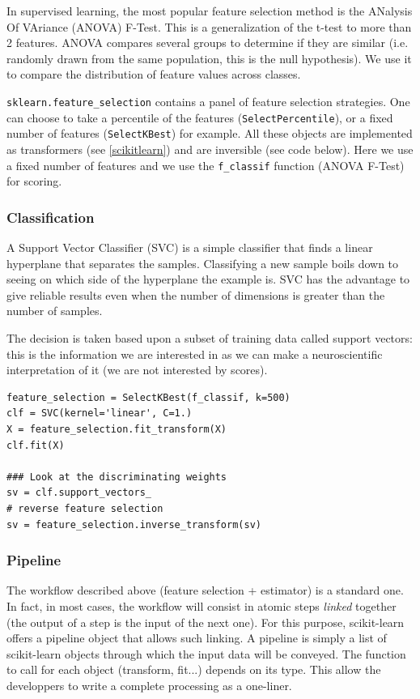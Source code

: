 \documentclass{frontiersSCNS} %
\begin{document}
In supervised learning, the most popular feature selection method is the
ANalysis Of VAriance (ANOVA) F-Test. This is a generalization of the t-test to
more than 2 features. ANOVA compares several
groups to determine if they are similar (i.e. randomly drawn from the same
population, this is the null hypothesis). We use it to compare the distribution
of feature values across classes.

\verb!sklearn.feature_selection! contains a panel of feature selection
strategies. One can choose to take a percentile of the features
(\verb!SelectPercentile!), or a fixed number of features (\verb!SelectKBest!)
for example. All these objects are implemented as transformers (see
\ref{scikitlearn}) and are inversible (see code below).
Here we use a fixed number of features and we use the \verb!f_classif! function
(ANOVA F-Test) for scoring.

\subsubsection{Classification}

A Support Vector Classifier (SVC) is a simple classifier that finds a linear
hyperplane that separates the samples. Classifying a new sample boils down to
seeing on which side of the hyperplane the example is. SVC has the advantage to
give reliable results even when the number of dimensions is greater than the
number of samples.

The decision is taken based upon a subset of training data called support
vectors: this is the information we are interested in as we can make a
neuroscientific interpretation of it (we are not interested by scores).

\begin{lstlisting}
feature_selection = SelectKBest(f_classif, k=500)
clf = SVC(kernel='linear', C=1.)
X = feature_selection.fit_transform(X)
clf.fit(X)

### Look at the discriminating weights
sv = clf.support_vectors_
# reverse feature selection
sv = feature_selection.inverse_transform(sv)
\end{lstlisting}

\subsubsection{Pipeline}

The workflow described above (feature selection + estimator) is a standard one.
In fact, in most cases, the workflow will consist in atomic steps
\textit{linked} together (the output of a step is the input of the next one).
For this purpose, scikit-learn offers a pipeline object that allows such
linking. A pipeline is simply a list of scikit-learn objects through which the
input data will be conveyed. The function to call for each object (transform,
fit...) depends on its type.
This allow the developpers to write a complete processing as a one-liner.
\end{document}

